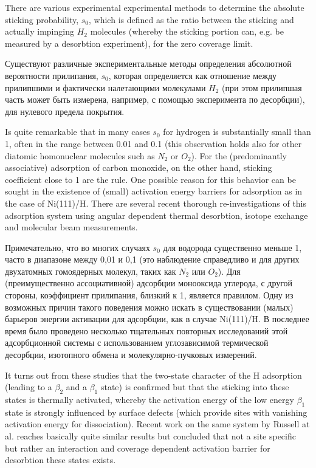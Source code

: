 \documentclass[11pt]{article}
\begin{document}
There are various experimental experimental methods to determine the
absolute sticking probability, \(s_0\), which is defined as the ratio
between the sticking and actually impinging \(H_2\) molecules (whereby
the sticking portion can, e.g. be measured by a desorbtion experiment),
for the zero coverage limit.

Существуют различные экспериментальные методы определения абсолютной
вероятности прилипания, \(s_0\), которая определяется как отношение
между прилипшими и фактически налетающими молекулами \(H_2\) (при этом
прилипшая часть может быть измерена, например, с помощью эксперимента по
десорбции), для нулевого предела покрытия.

Is quite remarkable that in many cases \(s_0\) for hydrogen is
substantially small than 1, often in the range between 0.01 and 0.1
(this observation holds also for other diatomic homonuclear molecules
such as \(N_2\) or \(O_2\)). For the (predominantly associative)
adsorption of carbon monoxide, on the other hand, sticking coefficient
close to 1 are the rule. One possible reason for this behavior can be
sought in the existence of (small) activation energy barriers for
adsorption as in the case of Ni(111)/H. There are several recent
thorough re-investigations of this adsorption system using angular
dependent thermal desorbtion, isotope exchange and molecular beam
measurements.

Примечательно, что во многих случаях \(s_0\) для водорода существенно
меньше 1, часто в диапазоне между 0,01 и 0,1 (это наблюдение справедливо
и для других двухатомных гомоядерных молекул, таких как \(N_2\) или
\(O_2\)). Для (преимущественно ассоциативной) адсорбции монооксида
углерода, с другой стороны, коэффициент прилипания, близкий к 1,
является правилом. Одну из возможных причин такого поведения можно
искать в существовании (малых) барьеров энергии активации для адсорбции,
как в случае Ni(111)/H. В последнее время было проведено несколько
тщательных повторных исследований этой адсорбционной системы с
использованием углозависимой термической десорбции, изотопного обмена и
молекулярно-пучковых измерений.

It turns out from these studies that the two-state character of the H
adsorption (leading to a \(\beta_2\) and a \(\beta_1\) state) is
confirmed but that the sticking into these states is thermally
activated, whereby the activation energy of the low energy \(\beta_1\)
state is strongly influenced by surface defects (which provide sites
with vanishing activation energy for dissociation). Recent work on the
same system by Russell at al. reaches basically quite similar results
but concluded that not a site specific but rather an interaction and
coverage dependent activation barrier for desorbtion these states
exists.
\end{document}
